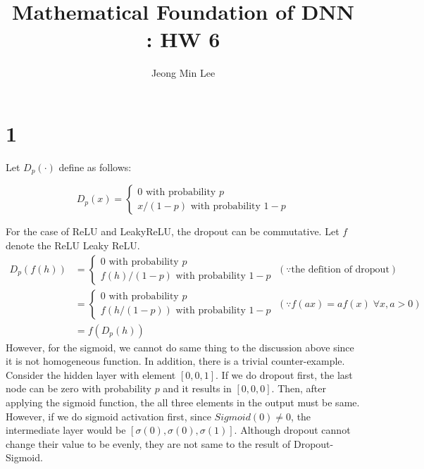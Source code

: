 \documentclass[10pt]{article}
\title{\textbf{Mathematical Foundation of DNN : HW 6}}
\author{Jeong Min Lee}
\begin{document}
\maketitle

\section*{1}
Let $D_p(\cdot)$ define as follows:

\begin{equation}
    D_p(x) = \begin{cases}
        0 \text{ with probability }p \\
        x/(1-p) \text{ with probability } 1-p
    \end{cases}
\end{equation}

For the case of ReLU and LeakyReLU, the dropout can be commutative. Let $f$ denote the ReLU Leaky ReLU.
\begin{align*}
    D_p(f(h)) &= \begin{cases}
        0 \text{ with probability } p \\
        f(h)/(1-p) \text{ with probability } 1-p
    \end{cases} \; (\because \text{the defition of dropout})\\&= \begin{cases}
        0 \text{ with probability } p \\
        f(h/(1-p)) \text{ with probability } 1-p
    \end{cases} \; (\because f(ax) = af(x)\; \forall x, a>0) \\ &= f(D_p(h))
\end{align*}
However, for the sigmoid, we cannot do same thing to the discussion above since it is not homogeneous function. 
In addition, there is a trivial counter-example. Consider the hidden layer with element $[0,0,1]$. If we do dropout first, 
the last node can be zero with probability $p$ and it results in $[0,0,0]$. Then, after applying the sigmoid function, the all three elements in the output must be same. 
However, if we do sigmoid activation first, since $Sigmoid(0) \neq 0 $, the intermediate layer would be $[\sigma(0),\sigma(0),\sigma(1)]$. 
Although dropout cannot change their value to be evenly, they are not same to the result of Dropout-Sigmoid.
\end{document}
